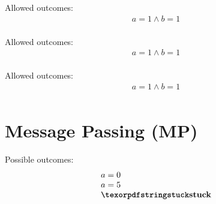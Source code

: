 \litmusTestEnd

\begin{minipage}[t]{0.2\linewidth}
Allowed outcomes:\\
\[\begin{array}{l}
a = 1 \land b = 1 \\
\end{array}\]
\end{minipage}
%
\lbJoinTemplate{\rlx}{\rlx}{\rlx}{\rlx}
\litmusTestEnd

\begin{minipage}[t]{0.2\linewidth}
Allowed outcomes:\\
\[\begin{array}{l}
a = 1 \land b = 1 \\
\end{array}\]
\end{minipage}
%
\lbJoinTemplate{\rlx}{\rel}{\rlx}{\rel}
\litmusTestEnd

\begin{minipage}[t]{0.2\linewidth}
Allowed outcomes:\\
\[\begin{array}{l}
a = 1 \land b = 1 \\
\end{array}\]
\end{minipage}
%
\lbJoinTemplate{\acq}{\rlx}{\acq}{\rlx}
\litmusTestEnd

\section{Message Passing (MP)}
\label{app:mp}

\begin{minipage}[t]{0.3\linewidth}
Possible outcomes:\\
\[\begin{array}{l}
a = 0 \\
a = 5 \\
\kw{stuck} \\
\end{array}\]
\end{minipage}
%
\mpTemplate{\rlx}{\na}{\na}{\rlx}{\rlx}{\na}
\litmusTestEnd

